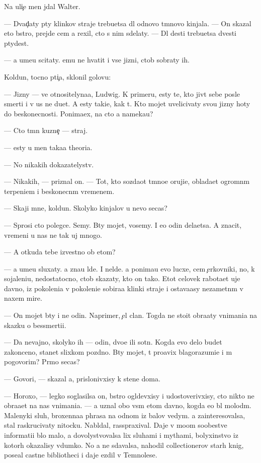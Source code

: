 \documentclass[10pt]{book}
\begin{document}
Na uli{\c}e men{\ia} jdal Walter.

— Dvad{\c}aty p{\ia}ty klinkov straje{\y} trebu{\y}etsa dl{\ia} odnovo t{\e}mnovo kinjala. — On skazal eto b{\yi}stro, prejde cem {\y}a rexil, cto s nim sdelaty. — Dl{\ia} des{\ia}ti trebu{\y}etsa dvesti p{\ia}tydes{\ia}t.

— {\Y}a ume{\y}u scitaty. {\Y}emu ne hvatit i vse{\y} jizni, ctob{\yi} sobraty ih.

Koldun, tocno pti{\c}a, sklonil golovu:

— Jizny — ve{\x} otnositelyna{\y}a, Ludwig. K primeru, {\y}esty te, kto jiv{\e}t sebe posle smerti i v us ne du{\y}et. A {\y}esty taki{\y}e, kak t{\yi}. Kto mojet uvelicivaty svo{\y}u jizny hoty do beskonecnosti. Ponima{\y}ex, na cto {\y}a nameka{\y}u?

— Cto t{\e}mn{\yi}{\y} kuzne{\c} — straj.

— {\Y}esty u men{\ia} taka{\y}a theori{\y}a.

— No nikakih dokazatelystv.

— Nikakih, — priznal on. — Tot, kto sozda{\y}ot t{\e}mno{\y}e oruji{\y}e, oblada{\y}et ogromn{\yi}m terpeni{\y}em i beskonecn{\yi}m vremenem.

— Skaji mne, koldun. Skolyko kinjalov u nevo se{\y}cas?

— Sprosi cto polegce. Semy. B{\yi}ty mojet, vosemy. I {\y}e{\x}o odin dela{\y}etsa. A znacit, vremeni u nas ne tak uj mnogo.

— A otkuda tebe izvestno ob etom?

— {\Y}a ume{\y}u sluxaty. {\Y}a zna{\y}u l{\io}de{\y}. I nel{\io}de{\y}. {\Y}a ponima{\y}u {\y}evo lucxe, cem {\c}erkovniki, no, k sojaleni{\y}u, nedostatocno, ctob{\yi} skazaty, kto on tako{\y}. Etot celovek rabota{\y}et uje davno, iz pokoleni{\y}a v pokoleni{\y}e sobira{\y}a klinki straje{\y} i ostava{\y}asy nezametn{\yi}m v naxem mire.

— On mojet b{\yi}ty i ne odin. Naprimer, {\c}el{\yi}{\y} clan. Togda ne stoit obra{\x}aty vnimani{\y}a na skazku o bessmerti{\y}i.

— Da nevajno, skolyko ih — odin, dvo{\y}e ili sotn{\ia}. Kogda {\y}evo delo budet zakonceno, stanet slixkom pozdno. B{\yi}ty mojet, t{\yi} pro{\y}avix blagorazumi{\y}e i m{\yi} pogovorim? Pr{\ia}mo se{\y}cas?

— Govori, — skazal {\y}a, prislonivxisy k stene doma.

— Horoxo, — legko soglasilsa on, b{\yi}stro ogl{\ia}devxisy i udostoverivxisy, cto nikto ne obra{\x}a{\y}et na nas vnimani{\y}a. — {\Y}a uznal obo vs{\e}m etom davno, kogda {\y}e{\x}o b{\yi}l molod{\yi}m. Malenyki{\y} sluh, broxenna{\y}a phrasa na odnom iz balov vedym. {\Y}a zainteresovalsa, stal raskrucivaty nitocku. Nabl{\io}dal, rasspraxival. Daje v mo{\y}om soob{\x}estve informati{\y}i b{\yi}lo malo, {\y}a dovolystvovalsa lix sluhami i mythami, bolyxinstvo iz kotor{\yi}h okazalisy v{\yi}dumko{\y}. No {\y}a ne sdavalsa, nahodil collectionerov star{\yi}h knig, pose{\x}al castn{\yi}{\y}e bibliotheci i daje {\y}ezdil v Temnoles{\y}e.
\end{document}
